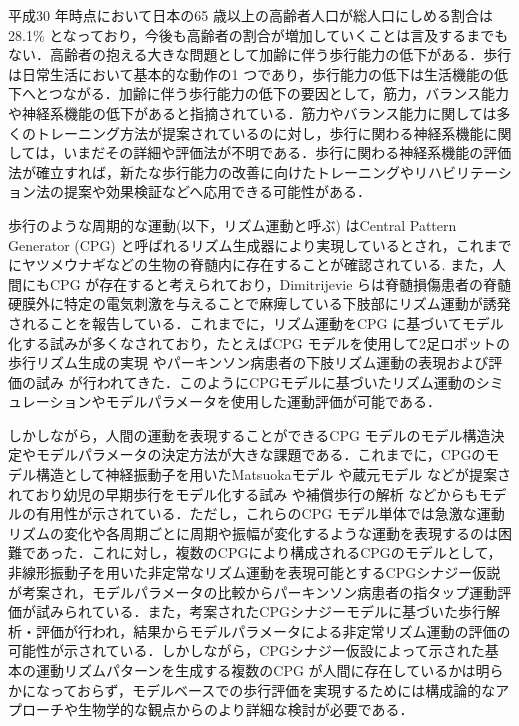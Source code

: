 \documentclass[graphicx,amsmath,cite]{jarticle}
\makeatletter
\def\section{\@startsection {section}{1}{\z@}{1.5ex plus .5ex minus .2ex}{1.8ex plus .2ex}{\large\center\bf\gt}}
\makeatother
\begin{document}
{\small
\section{はじめに}
\label{sec:intro}

平成30 年時点において日本の65 歳以上の高齢者人口が総人口にしめる割合は28.1\% となっており\cite{elderly}，今後も高齢者の割合が増加していくことは言及するまでもない．高齢者の抱える大きな問題として加齢に伴う歩行能力の低下がある．歩行は日常生活において基本的な動作の1 つであり，歩行能力の低下は生活機能の低下へとつながる．加齢に伴う歩行能力の低下の要因として，筋力，バランス能力や神経系機能の低下があると指摘されている\cite{neural1}\cite{neural2}．筋力やバランス能力に関しては多くのトレーニング方法が提案されているのに対し，歩行に関わる神経系機能に関しては，いまだその詳細や評価法が不明である．歩行に関わる神経系機能の評価法が確立すれば，新たな歩行能力の改善に向けたトレーニングやリハビリテーション法の提案や効果検証などへ応用できる可能性がある．

歩行のような周期的な運動(以下，リズム運動と呼ぶ) はCentral Pattern Generator (CPG) と呼ばれるリズム生成器により実現しているとされ，これまでにヤツメウナギなどの生物の脊髄内に存在することが確認されている\cite{cpg}. また，人間にもCPG が存在すると考えられており，Dimitrijevie らは脊髄損傷患者の脊髄硬膜外に特定の電気刺激を与えることで麻痺している下肢部にリズム運動が誘発されることを報告している\cite{human}．これまでに，リズム運動をCPG に基づいてモデル化する試みが多くなされており，たとえばCPG モデルを使用して2足ロボットの歩行リズム生成の実現\cite{robot} やパーキンソン病患者の下肢リズム運動の表現および評価の試み\cite{perkinson} が行われてきた．このようにCPGモデルに基づいたリズム運動のシミュレーションやモデルパラメータを使用した運動評価が可能である．

しかしながら，人間の運動を表現することができるCPG モデルのモデル構造決定やモデルパラメータの決定方法が大きな課題である．これまでに，CPGのモデル構造として神経振動子を用いたMatsuokaモデル\cite{matsuoka} や蔵元モデル\cite{kuramoto} などが提案されており幼児の早期歩行をモデル化する試み\cite{infant} や補償歩行の解析\cite{impaired} などからもモデルの有用性が示されている．ただし，これらのCPG モデル単体では急激な運動リズムの変化や各周期ごとに周期や振幅が変化するような運動を表現するのは困難であった．これに対し，複数のCPGにより構成されるCPGのモデルとして，非線形振動子を用いた非定常なリズム運動を表現可能とするCPGシナジー仮説が考案され，モデルパラメータの比較からパーキンソン病患者の指タップ運動評価が試みられている\cite{shima}．また，考案されたCPGシナジーモデルに基づいた歩行解析・評価が行われ，結果からモデルパラメータによる非定常リズム運動の評価の可能性が示されている\cite{seo}．しかしながら，CPGシナジー仮設によって示された基本の運動リズムパターンを生成する複数のCPG が人間に存在しているかは明らかになっておらず，モデルベースでの歩行評価を実現するためには構成論的なアプローチや生物学的な観点からのより詳細な検討が必要である．

}
\end{document}

